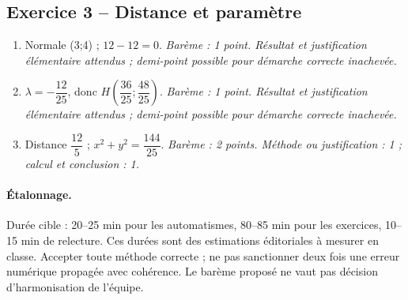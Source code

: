 \subsection*{Exercice 3 -- Distance et paramètre}
\begin{enumerate}
\item Normale (3;4) ; $12-12=0$. \textit{Barème : 1 point. Résultat et justification élémentaire attendus ; demi-point possible pour démarche correcte inachevée.}
\item $\lambda =-\dfrac{12}{25}$, donc $H(\dfrac{36}{25};\dfrac{48}{25})$. \textit{Barème : 1 point. Résultat et justification élémentaire attendus ; demi-point possible pour démarche correcte inachevée.}
\item Distance $\dfrac{12}{5}$ ; $x^2+y^2=\dfrac{144}{25}$. \textit{Barème : 2 points. Méthode ou justification : 1 ; calcul et conclusion : 1.}
\end{enumerate}
\paragraph{Étalonnage.} Durée cible : 20–25 min pour les automatismes, 80–85 min pour les exercices, 10–15 min de relecture. Ces durées sont des estimations éditoriales à mesurer en classe. Accepter toute méthode correcte ; ne pas sanctionner deux fois une erreur numérique propagée avec cohérence. Le barème proposé ne vaut pas décision d’harmonisation de l’équipe.
